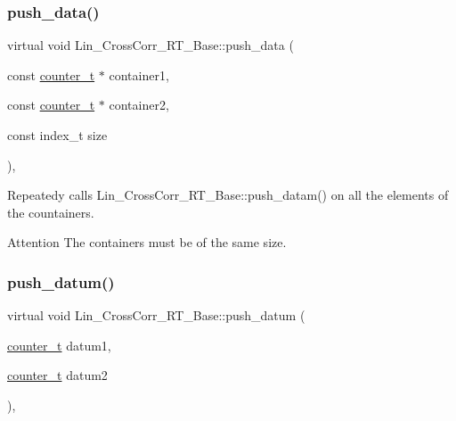 \mbox{\label{classLin__CrossCorr__RT__Base_a48faa93c6766605436fd8399949beb11}} 
\subsubsection{\texorpdfstring{push\+\_\+data()}{push\_data()}}
{\footnotesize\ttfamily virtual void Lin\+\_\+\+Cross\+Corr\+\_\+\+R\+T\+\_\+\+Base\+::push\+\_\+data (\begin{DoxyParamCaption}\item[{const \hyperlink{types_8hpp_ac89ac912f524b3e3fa3720ea55fec966}{counter\+\_\+t} $\ast$}]{container1,  }\item[{const \hyperlink{types_8hpp_ac89ac912f524b3e3fa3720ea55fec966}{counter\+\_\+t} $\ast$}]{container2,  }\item[{const index\+\_\+t}]{size }\end{DoxyParamCaption})\hspace{0.3cm}{\ttfamily [inline]}, {}}



Repeatedy calls {\ttfamily Lin\+\_\+\+Cross\+Corr\+\_\+\+R\+T\+\_\+\+Base\+::push\+\_\+datam()} on all the elements of the countainers. 

\begin{DoxyAttention}{Attention}
The containers must be of the same size. 
\end{DoxyAttention}
\mbox{\label{classLin__CrossCorr__RT__Base_abdc90b5ab6a5f7ac98e97b3d16261834}} 
\subsubsection{\texorpdfstring{push\+\_\+datum()}{push\_datum()}}
{\footnotesize\ttfamily virtual void Lin\+\_\+\+Cross\+Corr\+\_\+\+R\+T\+\_\+\+Base\+::push\+\_\+datum (\begin{DoxyParamCaption}\item[{\hyperlink{types_8hpp_ac89ac912f524b3e3fa3720ea55fec966}{counter\+\_\+t}}]{datum1,  }\item[{\hyperlink{types_8hpp_ac89ac912f524b3e3fa3720ea55fec966}{counter\+\_\+t}}]{datum2 }\end{DoxyParamCaption})\hspace{0.3cm}{\ttfamily [inline]}, {}}



